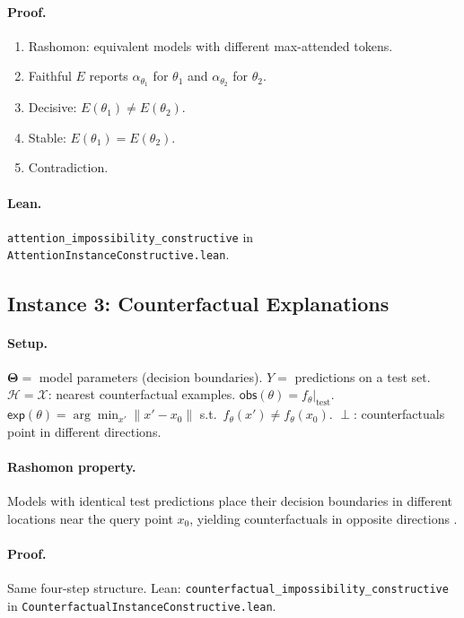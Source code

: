 \documentclass[11pt,a4paper]{article}
\newcommand{\Params}{\mathbf{\Theta}}
\newcommand{\sH}{\mathcal{H}}
\newcommand{\incomp}{\perp}
\begin{document}
\paragraph{Proof.}
\begin{enumerate}[nosep]
  \item Rashomon: equivalent models with different max-attended tokens.
  \item Faithful $E$ reports $\alpha_{\theta_1}$ for $\theta_1$ and
    $\alpha_{\theta_2}$ for $\theta_2$.
  \item Decisive: $E(\theta_1) \neq E(\theta_2)$.
  \item Stable: $E(\theta_1) = E(\theta_2)$.
  \item Contradiction.
\end{enumerate}

\paragraph{Lean.}
\texttt{attention\_impossibility\_constructive} in \texttt{AttentionInstanceConstructive.lean}.

\subsection{Instance 3: Counterfactual Explanations}
\label{app:proof-counterfactual}

\paragraph{Setup.}
$\Params ={}$ model parameters (decision boundaries).
$Y ={}$ predictions on a test set.
$\sH = \mathcal{X}$: nearest counterfactual examples.
$\mathsf{obs}(\theta) = f_\theta|_{\mathrm{test}}$.
$\mathsf{exp}(\theta) = \arg\min_{x'} \|x' - x_0\|$ s.t.\ $f_\theta(x') \neq f_\theta(x_0)$.
$\incomp$: counterfactuals point in different directions.

\paragraph{Rashomon property.}
Models with identical test predictions place their decision boundaries in
different locations near the query point $x_0$, yielding counterfactuals
in opposite directions \citep{semenova2022existence,fisher2019models}.

\paragraph{Proof.}
Same four-step structure.  Lean:
\texttt{counterfactual\_impossibility\_constructive} in \texttt{Counterfactual\-Instance\-Constructive.lean}.
\end{document}
